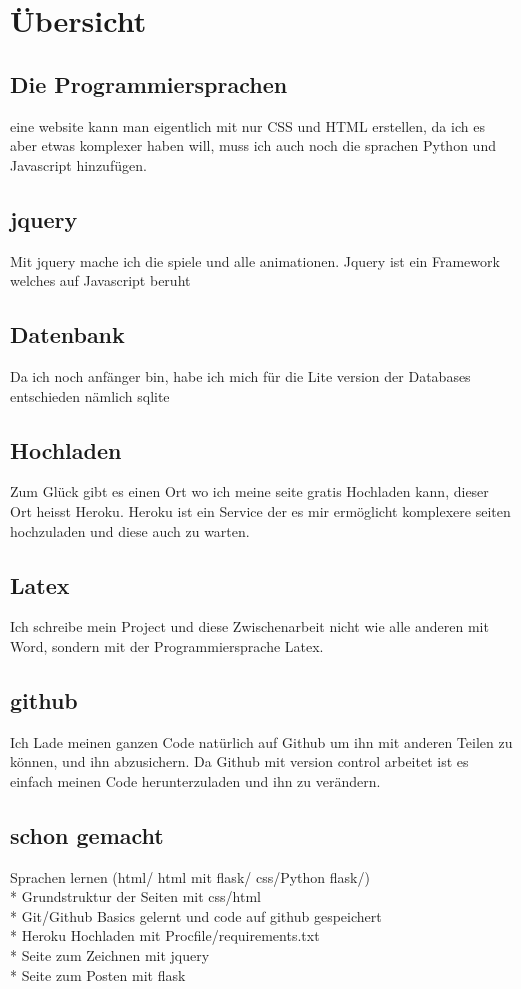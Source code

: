 \documentclass{article}
\begin{document}
\section{\"Ubersicht}
\subsection{Die Programmiersprachen}
eine website kann man eigentlich mit nur CSS und HTML erstellen, da ich es aber etwas komplexer haben will, muss ich auch noch die sprachen Python und Javascript hinzuf\"ugen.
\subsection{jquery}
Mit jquery mache ich die spiele und alle animationen. Jquery ist ein Framework welches auf Javascript beruht
\subsection{Datenbank}
Da ich noch anf\"anger bin, habe ich mich f\"ur die Lite version der Databases entschieden n\"amlich sqlite
\subsection{Hochladen}
Zum Gl\"uck gibt es einen Ort wo ich meine seite gratis Hochladen kann, dieser Ort heisst Heroku.
Heroku ist ein Service der es mir erm\"oglicht komplexere seiten hochzuladen und diese auch zu warten.
\subsection{Latex}
Ich schreibe mein Project und diese Zwischenarbeit nicht wie alle anderen mit Word, sondern mit der Programmiersprache Latex.
\subsection{github}
Ich Lade meinen ganzen Code nat\"urlich auf Github um ihn mit anderen Teilen zu k\"onnen, und ihn abzusichern.
Da Github mit version control arbeitet ist es einfach meinen Code herunterzuladen und ihn zu ver\"andern.

\subsection{schon gemacht}
Sprachen lernen (html/ html mit flask/ css/Python flask/)
\\*
Grundstruktur der Seiten mit css/html
\\*
Git/Github Basics gelernt und code auf github gespeichert
\\*
Heroku Hochladen mit Procfile/requirements.txt
\\*
Seite zum Zeichnen mit jquery
\\*
Seite zum Posten mit flask
\end{document}
